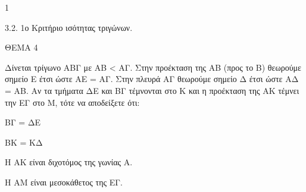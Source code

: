 \begin{ylh}{1}
    \item 3.2. 1ο Κριτήριο ισότητας τριγώνων.
\end{ylh}

ΘΕΜΑ 4

Δίνεται τρίγωνο ΑΒΓ με ΑΒ \textless{} ΑΓ. Στην προέκταση της ΑΒ (προς το Β) θεωρούμε σημείο Ε έτσι ώστε ΑΕ = ΑΓ. Στην πλευρά ΑΓ θεωρούμε σημείο Δ έτσι ώστε ΑΔ = ΑΒ. Αν τα τμήματα ΔΕ και ΒΓ τέμνονται στο Κ και η προέκταση της ΑΚ τέμνει την ΕΓ στο Μ, τότε να αποδείξετε ότι:

\begin{alist}
\item ΒΓ = ΔΕ 

\item ΒΚ = ΚΔ 

\item Η ΑΚ είναι διχοτόμος της γωνίας Α. 

\item Η ΑΜ είναι μεσοκάθετος της ΕΓ. 


\end{alist}

